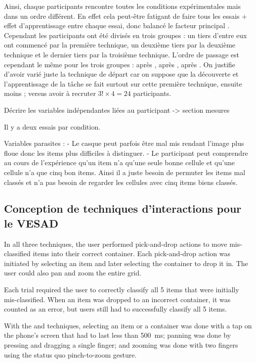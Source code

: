Ainsi, chaque participants rencontre toutes les conditions expérimentales mais dans un ordre différent. En effet cela peut-être fatigant de faire tous les essais + effet d'apprentissage entre chaque essai, donc balancé le facteur principal . Cependant les participants ont été divisés en trois groupes : un tiers d'entre eux ont commencé par la première technique, un deuxième tiers par la deuxième technique et le dernier tiers par la troisième technique. L'ordre de passage est cependant le même pour les trois groupes :  après ,  après ,  après . On justifie d'avoir varié juste la technique de départ car on suppose que la découverte et l'apprentissage de la tâche se fait surtout sur cette première technique, ensuite moins ; versus avoir à recruter $3! \times 4 = 24$ participants.

Décrire les variables indépendantes liées au participant -> section mesures

Il y a deux essais par condition.

Variables parasites : 
- Le casque peut parfois être mal mis rendant l'image plus floue donc les items plus difficiles à distinguer.
- Le participant peut comprendre au cours de l'expérience qu'un item n'a qu'une seule bonne cellule et qu'une cellule n'a que cinq bon items. Ainsi il a juste besoin de permuter les items mal classés et n'a pas besoin de regarder les cellules avec cinq items biens classés.


\subsection{Conception de techniques d'interactions pour le VESAD}
\label{sec:experiment_interaction_techniques}

In all three techniques, the user performed pick-and-drop actions to move mis-classified items into their correct container. Each pick-and-drop action was initiated by selecting an item and later selecting the container to drop it in. The user could also pan and zoom the entire grid.

Each trial required the user to correctly classify all 5 items that were initially mis-classified. When an item was dropped to an incorrect container, it was counted as an error, but users still had to successfully classify all 5 items.

With the  and  techniques, selecting an item or a container was done with a tap on the phone's screen that had to last less than \SI{500}{\ms}; panning was done by pressing and dragging a single finger; and zooming was done with two fingers using the status quo pinch-to-zoom gesture.

